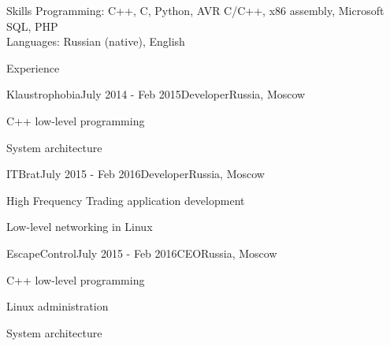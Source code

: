 \documentclass{resume} %
\begin{document}
\begin{rSection}{Skills}
Programming: C++, C, Python, AVR C/C++, x86 assembly, Microsoft SQL, PHP\\
Languages: Russian (native), English
\end{rSection}

\begin{rSection}{Experience}
	
	\begin{rSubsection}{Klaustrophobia}{July 2014 - Feb 2015}{Developer}{Russia, Moscow}
		\item C++ low-level programming
		\item System architecture
	\end{rSubsection}
	
	
	\begin{rSubsection}{ITBrat}{July 2015 - Feb 2016}{Developer}{Russia, Moscow}
		\item High Frequency Trading application development
		\item Low-level networking in Linux
	\end{rSubsection}
	
	\begin{rSubsection}{EscapeControl}{July 2015 - Feb 2016}{CEO}{Russia, Moscow}
		\item C++ low-level programming
		\item Linux administration
		\item System architecture
	\end{rSubsection}
	
\end{rSection}

\end{document}
